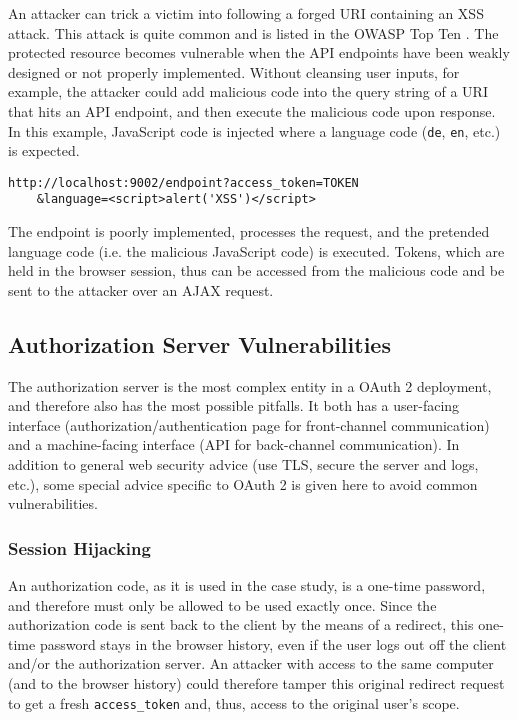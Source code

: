An attacker can trick a victim into following a forged URI containing an XSS attack. This attack is quite common and is listed in the OWASP Top Ten \cite{owasp2017}. The protected resource becomes vulnerable when the API endpoints have been weakly designed or not properly implemented. Without cleansing user inputs, for example, the attacker could add malicious code into the query string of a URI that hits an API endpoint, and then execute the malicious code upon response. In this example, JavaScript code is injected where a language code (\texttt{de}, \texttt{en}, etc.) is expected. 

\begin{verbatim}
http://localhost:9002/endpoint?access_token=TOKEN
    &language=<script>alert('XSS')</script>
\end{verbatim}

The endpoint is poorly implemented, processes the request, and the pretended language code (i.e. the malicious JavaScript code) is executed. Tokens, which are held in the browser session, thus can be accessed from the malicious code and be sent to the attacker over an AJAX request.

\subsection{Authorization Server Vulnerabilities}

The authorization server is the most complex entity in a OAuth 2 deployment, and therefore also has the most possible pitfalls. It both has a user-facing interface (authorization/authentication page for front-channel communication) and a machine-facing interface (API for back-channel communication). In addition to general web security advice (use TLS, secure the server and logs, etc.), some special advice specific to OAuth 2 is given here to avoid common vulnerabilities.

\subsubsection{Session Hijacking}

An authorization code, as it is used in the case study, is a one-time password, and therefore must only be allowed to be used exactly once. Since the authorization code is sent back to the client by the means of a redirect, this one-time password stays in the browser history, even if the user logs out off the client and/or the authorization server. An attacker with access to the same computer (and to the browser history) could therefore tamper this original redirect request to get a fresh \texttt{access\_token} and, thus, access to the original user's scope.

